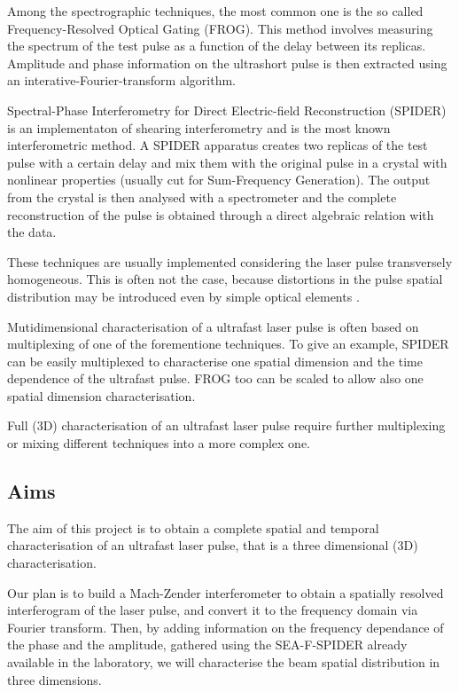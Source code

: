 \documentclass[12pt,a4paper,twoside]{article}
\begin{document}
Among the spectrographic techniques, the most common one is the so called Frequency-Resolved Optical Gating (FROG).
This method involves measuring the spectrum of the test pulse as a function of the delay between its replicas.
Amplitude and phase information on the ultrashort pulse is then extracted using an interative-Fourier-transform algorithm.

Spectral-Phase Interferometry for Direct Electric-field Reconstruction (SPIDER) is an implementaton of shearing interferometry and is the most known interferometric method.
A SPIDER apparatus creates two replicas of the test pulse with a certain delay and mix them with the original pulse in a crystal with nonlinear properties (usually cut for Sum-Frequency Generation).
The output from the crystal is then analysed with a spectrometer and the complete reconstruction of the pulse is obtained through a direct algebraic relation with the data.

These techniques are usually implemented considering the laser pulse transversely homogeneous.
This is often not the case, because distortions in the pulse spatial distribution may be introduced even by simple optical elements \cite{bor}.

Mutidimensional characterisation of a ultrafast laser pulse is often based on multiplexing of one of the forementione techniques.
To give an example, SPIDER can be easily multiplexed to characterise one spatial dimension and the time dependence of the ultrafast pulse.
FROG too can be scaled to allow also one spatial dimension characterisation.

Full (3D) characterisation of an ultrafast laser pulse require further multiplexing or mixing different techniques into a more complex one.

\subsection{Aims}
The aim of this project is to obtain a complete spatial and temporal characterisation of an ultrafast laser pulse, that is a three dimensional (3D) characterisation.

Our plan is to build a Mach-Zender interferometer to obtain a spatially resolved interferogram of the laser pulse, and convert it to the frequency domain via Fourier transform.
Then, by adding information on the frequency dependance of the phase and the amplitude, gathered using the SEA-F-SPIDER already available in the laboratory, we will characterise the beam spatial distribution in three dimensions.
\end{document}
